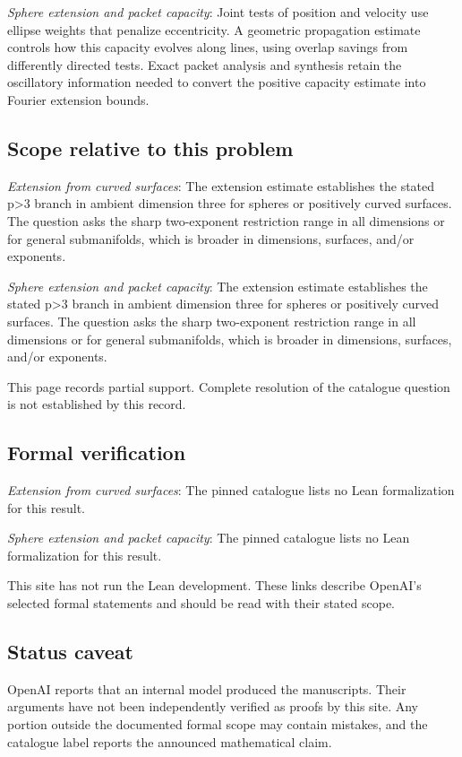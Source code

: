 \documentclass[11pt]{article}
\begin{document}
\textit{Sphere extension and packet capacity}: Joint tests of position and velocity use ellipse weights that penalize eccentricity. A geometric propagation estimate controls how this capacity evolves along lines, using overlap savings from differently directed tests. Exact packet analysis and synthesis retain the oscillatory information needed to convert the positive capacity estimate into Fourier extension bounds.

\subsection{Scope relative to this problem}
\textit{Extension from curved surfaces}: The extension estimate establishes the stated p>3 branch in ambient dimension three for spheres or positively curved surfaces. The question asks the sharp two-exponent restriction range in all dimensions or for general submanifolds, which is broader in dimensions, surfaces, and/or exponents.

\textit{Sphere extension and packet capacity}: The extension estimate establishes the stated p>3 branch in ambient dimension three for spheres or positively curved surfaces. The question asks the sharp two-exponent restriction range in all dimensions or for general submanifolds, which is broader in dimensions, surfaces, and/or exponents.

This page records partial support. Complete resolution of the catalogue question is not established by this record.

\subsection{Formal verification}
\textit{Extension from curved surfaces}: The pinned catalogue lists no Lean formalization for this result.

\textit{Sphere extension and packet capacity}: The pinned catalogue lists no Lean formalization for this result.

This site has not run the Lean development. These links describe OpenAI’s selected formal statements and should be read with their stated scope.

\subsection{Status caveat}
OpenAI reports that an internal model produced the manuscripts. Their arguments have not been independently verified as proofs by this site. Any portion outside the documented formal scope may contain mistakes, and the catalogue label reports the announced mathematical claim.
\end{document}
